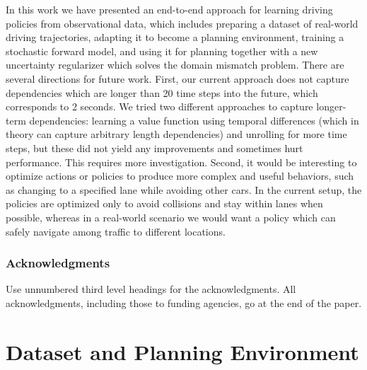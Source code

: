 \documentclass{article} %
\begin{document}
  In this work we have presented an end-to-end approach for learning driving policies from observational data, which includes preparing a dataset of real-world driving trajectories, adapting it to become a planning environment, training a stochastic forward model, and using it for planning together with a new uncertainty regularizer which solves the domain mismatch problem.
  There are several directions for future work.
  First, our current approach does not capture dependencies which are longer than 20 time steps into the future, which corresponds to 2 seconds.
  We tried two different approaches to capture longer-term dependencies: learning a value function using temporal differences (which in theory can capture arbitrary length dependencies) and unrolling for more time steps, but these did not yield any improvements and sometimes hurt performance. This requires more investigation.
  Second, it would be interesting to optimize actions or policies to produce more complex and useful behaviors, such as changing to a specified lane while avoiding other cars.
  In the current setup, the policies are optimized only to avoid collisions and stay within lanes when possible, whereas in a real-world scenario we would want a policy which can safely navigate among traffic to different locations.



\subsubsection*{Acknowledgments}

Use unnumbered third level headings for the acknowledgments. All
acknowledgments, including those to funding agencies, go at the end of the paper.




\appendix

\section{Dataset and Planning Environment}
\label{i80-dataset-prep}
\end{document}
